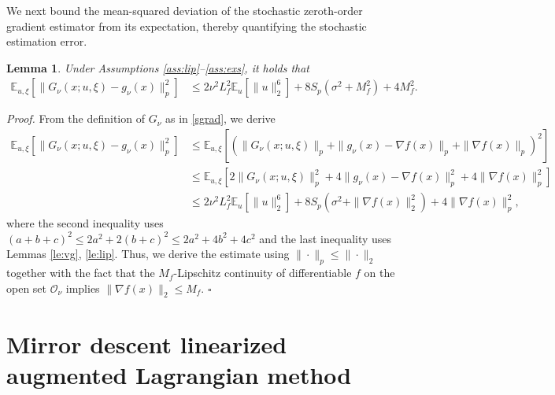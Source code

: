 \documentclass[11pt]{article}
\newtheorem{lemma}{Lemma}[section]
\newenvironment{proof}[1][Proof]{%
    \par\noindent\textit{#1.}\enspace
  }{%
    \hfill\ensuremath{\square}\par
  }%
\numberwithin{equation}{section}
\newcommand{\E}{\mathbb{E}}
\newcommand{\bee}{\begin{equation*}}
\newcommand{\eee}{\end{equation*}}
\begin{document}
We next bound the mean-squared  deviation of the stochastic zeroth-order gradient estimator from its expectation, thereby quantifying the stochastic estimation error.
\begin{lemma}\label{le:se}
    Under Assumptions \ref{ass:lip}--\ref{ass:exs}, it holds that 
        \begin{equation*}     \begin{aligned}
            \E_{u,\xi} [\|G_\nu(x;u,\xi)-g_\nu(x)\|_p^2]& \leq 2\nu^2L_f^2\E_u [\|u\|_2^6]+8 S_p (\sigma^2+M_f^2)+ 4M_f^2.
    \end{aligned}     \end{equation*}
\end{lemma}
\begin{proof} From the definition of $G_\nu$ as in \eqref{sgrad}, we  derive
    \bee\begin{aligned}
        \E_{u,\xi} [\|G_\nu(x;u,\xi)-g_\nu(x)\|_p^2] &  \le \E_{u,\xi}[(\|G_\nu(x;u,\xi)\|_p + \|g_\nu(x)-\nabla f(x)\|_p + \|\nabla f(x)\|_p)^2] \\
        &\leq \E_{u,\xi} [2\|G_\nu(x;u,\xi)\|_p^2 +4\|g_\nu(x)-\nabla f(x)\|_p^2 + 4\|\nabla f(x)\|_p^2]\\
        & \leq 2\nu^2L_f^2\E_u [\|u\|_2^6]+8 S_p (\sigma^2+\|\nabla f(x)\|_2^2)+ 4\|\nabla f(x)\|_p^2,
    \end{aligned}  \eee
   where the second inequality uses $(a+b+c)^2\le 2a^2 + 2(b+c)^2\le 2 a^2 + 4b^2 + 4c^2$ and  the last inequality uses  Lemmas \ref{le:vg}, \ref{le:lip}. Thus, we derive the estimate using \(\|\cdot\|_p \le \|\cdot\|_2\) together with the fact that the \(M_f\)-Lipschitz continuity of  differentiable \(f\) on the open set \(\mathcal O_\nu\) implies \(\|\nabla f(x)\|_2 \le M_f\).
\end{proof}



\section{Mirror descent linearized augmented Lagrangian method}\label{sec:alg}
\end{document}
